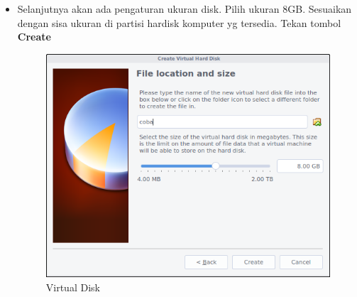 \documentclass[12pt,]{article}
\begin{document}
\begin{itemize}
		\item Selanjutnya akan ada pengaturan ukuran disk.
		Pilih ukuran 8GB. Sesuaikan dengan sisa ukuran di partisi hardisk komputer yg tersedia.
		Tekan tombol \textbf{Create}
		\begin{figure}[H]
			\centering
			\includegraphics[width=0.4\linewidth]{images/vbox_installinux/s2}
			\caption{Virtual Disk}
		\end{figure}
	\end{itemize}
	
\end{document}
